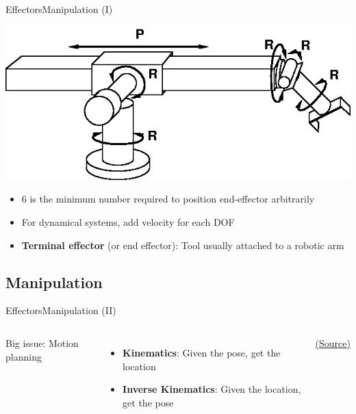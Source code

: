 \documentclass[10pt,compress]{beamer} %
\begin{document}
\begin{frame}{Effectors}{Manipulation (I)}
	\begin{center}
	\includegraphics[width=0.5\linewidth]{figs/stanford-arm.eps}
	\end{center}
	\begin{itemize}
		\item 6 is the minimum number required to position end-effector arbitrarily
		\item For dynamical systems, add velocity for each DOF
		\item \textbf{Terminal effector} (or end effector): Tool usually attached to a robotic arm
	\end{itemize}
\end{frame}

\subsection{Manipulation}
\begin{frame}{Effectors}{Manipulation (II)}
	\vspace{-1cm}
   \begin{columns}
			Big issue: Motion planning
			\begin{itemize}
				\item \textbf{Kinematics}: Given the pose, get the location
				\item \textbf{Inverse Kinematics}: Given the location, get the pose
			\end{itemize}
	   		\begin{center}
			\vspace{-0.2cm}
			\tiny{\href{http://www.texample.net/tikz/examples/three-link-annotated/}{(Source)}}
			\end{center}
	\end{columns}
\end{frame}
\end{document}
